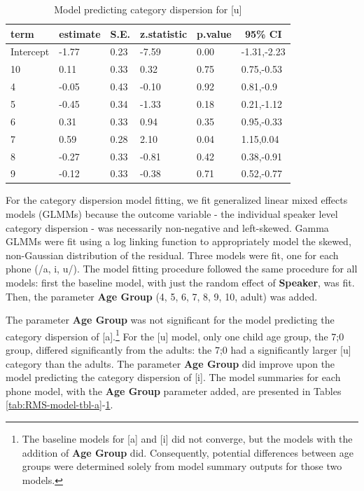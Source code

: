 \documentclass[
]{article}
\begin{document}
\begin{table}[tbp]

\begin{center}
\begin{threeparttable}

\caption{\label{tab:RMS-model-tbl-u}Model predicting category dispersion for [u]}

\begin{tabular}{llllll}
\toprule
term & \multicolumn{1}{c}{estimate} & \multicolumn{1}{c}{S.E.} & \multicolumn{1}{c}{z.statistic} & \multicolumn{1}{c}{p.value} & \multicolumn{1}{c}{95\% CI}\\
\midrule
Intercept & -1.77 & 0.23 & -7.59 & 0.00 & -1.31,-2.23\\
10 & 0.11 & 0.33 & 0.32 & 0.75 & 0.75,-0.53\\
4 & -0.05 & 0.43 & -0.10 & 0.92 & 0.81,-0.9\\
5 & -0.45 & 0.34 & -1.33 & 0.18 & 0.21,-1.12\\
6 & 0.31 & 0.33 & 0.94 & 0.35 & 0.95,-0.33\\
7 & 0.59 & 0.28 & 2.10 & 0.04 & 1.15,0.04\\
8 & -0.27 & 0.33 & -0.81 & 0.42 & 0.38,-0.91\\
9 & -0.12 & 0.33 & -0.38 & 0.71 & 0.52,-0.77\\
\bottomrule
\end{tabular}

\end{threeparttable}
\end{center}

\end{table}

For the category dispersion model fitting, we fit generalized linear mixed effects models (GLMMs) because the outcome variable - the individual speaker level category dispersion - was necessarily non-negative and left-skewed. Gamma GLMMs were fit using a log linking function to appropriately model the skewed, non-Gaussian distribution of the residual. Three models were fit, one for each phone (/a, i, u/). The model fitting procedure followed the same procedure for all models: first the baseline model, with just the random effect of \textbf{Speaker}, was fit. Then, the parameter \textbf{Age Group} (4, 5, 6, 7, 8, 9, 10, adult) was added.

The parameter \textbf{Age Group} was not significant for the model predicting the category dispersion of {[}a{]}.\footnote{The baseline models for {[}a{]} and {[}i{]} did not converge, but the models with the addition of \textbf{Age Group} did. Consequently, potential differences between age groups were determined solely from model summary outputs for those two models.} For the {[}u{]} model, only one child age group, the 7;0 group, differed significantly from the adults: the 7;0 had a significantly larger {[}u{]} category than the adults. The parameter \textbf{Age Group} did improve upon the model predicting the category dispersion of {[}i{]}. The model summaries for each phone model, with the \textbf{Age Group} parameter added, are presented in Tables \ref{tab:RMS-model-tbl-a}-\ref{tab:RMS-model-tbl-u}.
\end{document}
